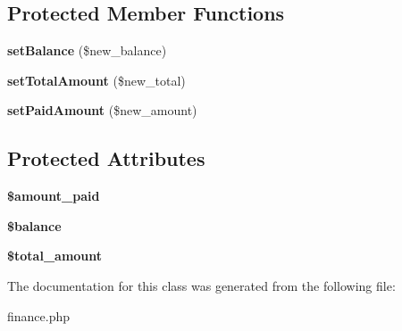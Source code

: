 \subsection*{Protected Member Functions}
\begin{DoxyCompactItemize}
\item 
\hypertarget{classFinance_a14a7d3d94974f747ffd5503b0b7b90d4}{{\bfseries set\-Balance} (\$new\-\_\-balance)}\label{classFinance_a14a7d3d94974f747ffd5503b0b7b90d4}

\item 
\hypertarget{classFinance_ace1d29339a08e672389c89d3cf39ab4a}{{\bfseries set\-Total\-Amount} (\$new\-\_\-total)}\label{classFinance_ace1d29339a08e672389c89d3cf39ab4a}

\item 
\hypertarget{classFinance_a397254b4e592deb0a5188373c0d9c9d1}{{\bfseries set\-Paid\-Amount} (\$new\-\_\-amount)}\label{classFinance_a397254b4e592deb0a5188373c0d9c9d1}

\end{DoxyCompactItemize}
\subsection*{Protected Attributes}
\begin{DoxyCompactItemize}
\item 
\hypertarget{classFinance_a4294eb439113ff72e8d7d4b92c7dc9de}{{\bfseries \$amount\-\_\-paid}}\label{classFinance_a4294eb439113ff72e8d7d4b92c7dc9de}

\item 
\hypertarget{classFinance_a1a91919262e3ea72dec88e0d1298fc19}{{\bfseries \$balance}}\label{classFinance_a1a91919262e3ea72dec88e0d1298fc19}

\item 
\hypertarget{classFinance_a317c7f0bfd7bc04f850d89a1d8fcedfa}{{\bfseries \$total\-\_\-amount}}\label{classFinance_a317c7f0bfd7bc04f850d89a1d8fcedfa}

\end{DoxyCompactItemize}


The documentation for this class was generated from the following file\-:\begin{DoxyCompactItemize}
\item 
finance.\-php\end{DoxyCompactItemize}
